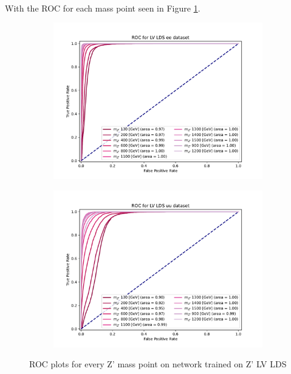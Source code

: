 \documentclass[12pt, a4paper]{book}
\begin{document}
\\With the ROC for each mass point seen in Figure \ref{fig:LV_LDS_ROCS}.
\begin{figure}[!ht]
	\centering
	\begin{subfigure}[b]{0.49\textwidth}
      \centering
      \includegraphics[width=1\textwidth]{XGBoost/LV_LDS/ROC_ee.pdf}
      \end{subfigure}
   \hfill
   \begin{subfigure}[b]{0.49\textwidth}
      \centering
      \includegraphics[width=1\textwidth]{XGBoost/LV_LDS/ROC_uu.pdf}
      \end{subfigure}
   \caption{ROC plots for every Z' mass point on network trained on Z' LV LDS}\label{fig:LV_LDS_ROCS}
\end{figure}
\end{document}
